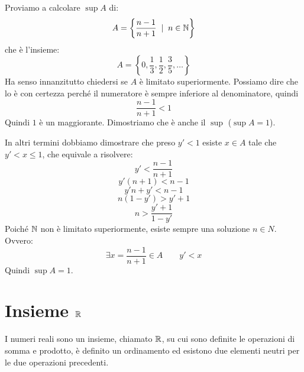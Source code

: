 \begin{example}
Proviamo a calcolare $\sup A$ di:
\begin{equation*}
A = \left\{\frac{n-1}{n+1} \; \mid \; n \in \mathbb N \right\}
\end{equation*}
che è l'insieme:
\begin{equation*}
A = \left\{0, \frac{1}{3}, \frac{1}{2}, \frac{3}{5}, \ldots \right\}
\end{equation*}
Ha senso innanzitutto chiedersi se $A$ è limitato superiormente. Possiamo dire che lo è con certezza perché il numeratore è sempre inferiore al denominatore, quindi
\begin{equation*}
\frac{n-1}{n+1} < 1
\end{equation*}
Quindi $1$ è un maggiorante. Dimostriamo che è anche il $\sup$ ($\sup A = 1$).

In altri termini dobbiamo dimostrare che preso $y' < 1$ esiste $x \in A$ tale che $y' < x \le 1$, che equivale a risolvere:
\begin{equation*}
y' < \frac{n-1}{n+1}
\end{equation*}
\begin{equation*}
y' (n+1) < n-1
\end{equation*}
\begin{equation*}
y'n + y' < n -1
\end{equation*}
\begin{equation*}
n(1-y')>y'+1
\end{equation*}
\begin{equation*}
n > \frac{y'+1}{1-y'}
\end{equation*}
Poiché $\mathbb N$ non è limitato superiormente, esiste sempre una soluzione $n \in N$. Ovvero:
\begin{equation*}
\exists x = \frac{n-1}{n+1} \in A \qquad y' < x
\end{equation*}
Quindi $\sup A = 1$.
\end{example}

\section{Insieme $\mathbb R$}

I numeri reali sono un insieme, chiamato $\mathbb R$, su cui sono definite le operazioni di somma e prodotto, è definito un ordinamento ed esistono due elementi neutri per le due operazioni precedenti.

